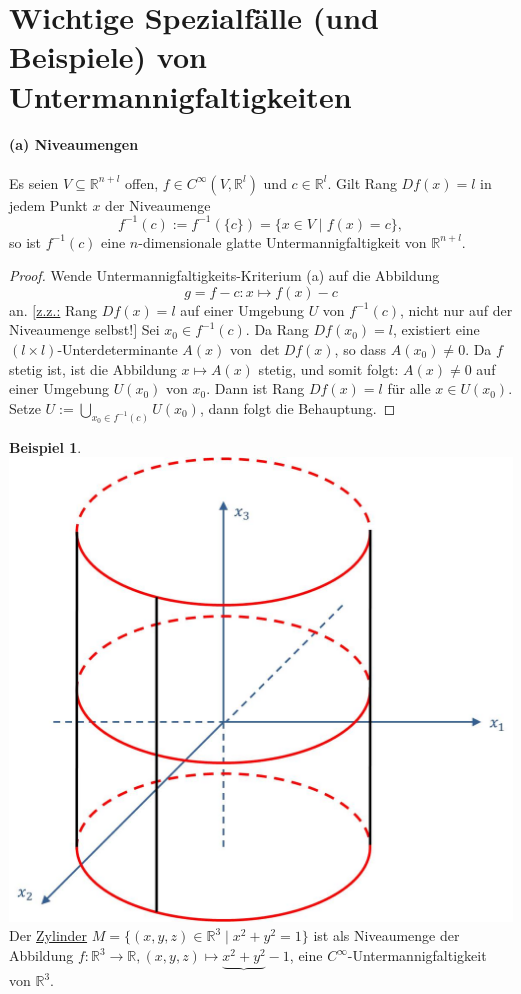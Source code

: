 \documentclass[a4paper,11pt,notitlepage]{report}
\theoremstyle{definition}
\newtheorem{example}{Beispiel}[chapter]
\newcommand{\R}{{\ensuremath{\mathbb{R}}}}
\begin{document}
\section{Wichtige Spezialfälle (und Beispiele) von Untermannigfaltigkeiten}
\paragraph{(a) Niveaumengen}
Es seien $V \subseteq \R^{n+l}$ offen, $f \in C^\infty(V,\R^l)$ und $c \in \R^l$. Gilt Rang $Df(x)=l$ in jedem Punkt $x$ der Niveaumenge
$$f^{-1}(c) := f^{-1}(\{c\}) = \{x \in V \mid f(x) = c\},$$
so ist $f^{-1}(c)$ eine $n$-dimensionale glatte Untermannigfaltigkeit von $\R^{n+l}$.

\begin{proof}
	Wende Untermannigfaltigkeits-Kriterium (a) auf die Abbildung $$g = f - c \colon x \mapsto f(x)-c$$ an.
	\newline
	$[$\underline{z.z.:} Rang $Df(x)=l$ auf einer Umgebung $U$ von $f^{-1}(c)$, nicht nur auf der Niveaumenge selbst!$]$
	\newline
	Sei $x_0 \in f^{-1}(c)$. Da Rang $Df(x_0) = l$, existiert eine $(l \times l)$-Unterdeterminante $A(x)$ von $\det{Df(x)}$, so dass $A(x_0)\neq 0$. Da $f$ stetig ist, ist die Abbildung $x \mapsto A(x)$ stetig, und somit folgt: $A(x)\neq 0$ auf einer Umgebung $U(x_0)$ von $x_0$. Dann ist Rang $Df(x)=l$ für alle $x \in U(x_0)$.
	\newline
	Setze $U:= \bigcup\limits_{x_0 \in f^{-1}(c)}{U(x_0)}$, dann folgt die Behauptung.
\end{proof}

\begin{example}
	\includegraphics[scale=0.4]{images/Zylinder.jpg}
	\newline
	Der \underline{Zylinder} $M=\{(x,y,z) \in \R^3 \mid x^2+y^2 = 1\}$ ist als Niveaumenge der Abbildung $f \colon \R^3 \rightarrow \R, (x,y,z) \mapsto \underbrace{x^2+y^2}-1$, eine $C^\infty$-Untermannigfaltigkeit von $\R^3$.
\end{example}
\end{document}
